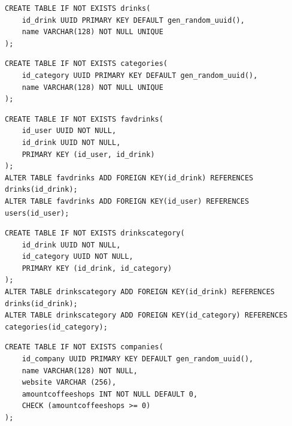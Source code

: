 \begin{center}
	\captionsetup{justification=raggedright,singlelinecheck=off}
	\begin{lstlisting}[label=create_drinks,caption=Создание таблицы drinks]
CREATE TABLE IF NOT EXISTS drinks(
	id_drink UUID PRIMARY KEY DEFAULT gen_random_uuid(),
	name VARCHAR(128) NOT NULL UNIQUE
);
	\end{lstlisting}
\end{center}

\begin{center}
	\captionsetup{justification=raggedright,singlelinecheck=off}
	\begin{lstlisting}[label=create_categories,caption=Создание таблицы categories]
CREATE TABLE IF NOT EXISTS categories(
	id_category UUID PRIMARY KEY DEFAULT gen_random_uuid(),
	name VARCHAR(128) NOT NULL UNIQUE
);
	\end{lstlisting}
\end{center}

\begin{center}
	\captionsetup{justification=raggedright,singlelinecheck=off}
	\begin{lstlisting}[label=create_favdrinks,caption=Создание таблицы favdrinks]
CREATE TABLE IF NOT EXISTS favdrinks(
	id_user UUID NOT NULL,
	id_drink UUID NOT NULL,
	PRIMARY KEY (id_user, id_drink)
);
ALTER TABLE favdrinks ADD FOREIGN KEY(id_drink) REFERENCES drinks(id_drink);
ALTER TABLE favdrinks ADD FOREIGN KEY(id_user) REFERENCES users(id_user);
	\end{lstlisting}
\end{center}

\begin{center}
	\captionsetup{justification=raggedright,singlelinecheck=off}
	\begin{lstlisting}[label=create_drinkscategory,caption=Создание таблицы drinkscategory]
CREATE TABLE IF NOT EXISTS drinkscategory(
	id_drink UUID NOT NULL,
	id_category UUID NOT NULL,
	PRIMARY KEY (id_drink, id_category)
);
ALTER TABLE drinkscategory ADD FOREIGN KEY(id_drink) REFERENCES drinks(id_drink);
ALTER TABLE drinkscategory ADD FOREIGN KEY(id_category) REFERENCES categories(id_category);
	\end{lstlisting}
\end{center}


\begin{center}
	\captionsetup{justification=raggedright,singlelinecheck=off}
	\begin{lstlisting}[label=create_companies,caption=Создание таблицы companies]
CREATE TABLE IF NOT EXISTS companies(
	id_company UUID PRIMARY KEY DEFAULT gen_random_uuid(),
	name VARCHAR(128) NOT NULL,
	website VARCHAR (256),
	amountcoffeeshops INT NOT NULL DEFAULT 0,
	CHECK (amountcoffeeshops >= 0)
);
	\end{lstlisting}
\end{center}

